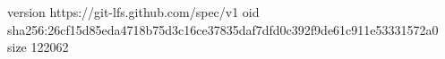 version https://git-lfs.github.com/spec/v1
oid sha256:26cf15d85eda4718b75d3c16ce37835daf7dfd0c392f9de61c911e53331572a0
size 122062

